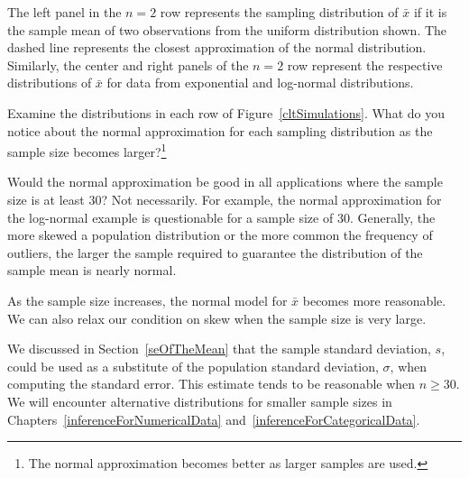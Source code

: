 The left panel in the $n=2$ row represents the sampling distribution of $\bar{x}$ if it is the sample mean of two observations from the uniform distribution shown. The dashed line represents the closest approximation of the normal distribution. Similarly, the center and right panels of the $n=2$ row represent the respective distributions of $\bar{x}$ for data from exponential and log-normal distributions.

\begin{exercise}
Examine the distributions in each row of Figure~\ref{cltSimulations}. What do you notice about the normal approximation for each sampling distribution as the sample size becomes larger?\footnote{The normal approximation becomes better as larger samples are used.}
\end{exercise}

\begin{example}{Would the normal approximation be good in all applications where the sample size is at least 30?}
Not necessarily. For example, the normal approximation for the log-normal example is questionable for a sample size of 30. Generally, the more skewed a population distribution or the more common the frequency of outliers, the larger the sample required to guarantee the distribution of the sample mean is nearly normal.
\end{example}

\begin{tipBox}{
As the sample size increases, the normal model for $\bar{x}$ becomes more reasonable. We can also relax our condition on skew when the sample size is very large.}
\end{tipBox}

We discussed in Section~\ref{seOfTheMean} that the sample standard deviation, $s$, could be used as a substitute of the population standard deviation, $\sigma$, when computing the standard error. This estimate tends to be reasonable when $n\geq30$. We will encounter alternative distributions for smaller sample sizes in Chapters~\ref{inferenceForNumericalData} and~\ref{inferenceForCategoricalData}.


